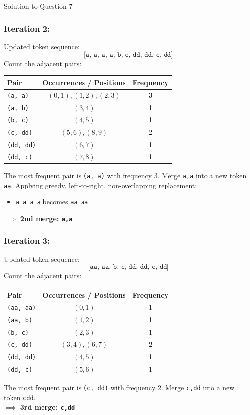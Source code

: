 \documentclass[11pt,a4paper]{article}
\begin{document}
\begin{solutionbox}{Solution to Question 7}
\subsubsection*{Iteration 2:}
Updated token sequence:
\[
\texttt{[a, a, a, a, b, c, dd, dd, c, dd]}
\]
Count the adjacent pairs:
\begin{center}
\begin{tabular}{lcc}
\toprule
\textbf{Pair} & \textbf{Occurrences / Positions} & \textbf{Frequency} \\
\midrule
\texttt{(a, a)} & $(0,1), (1,2), (2,3)$ & \textbf{3} \\
\texttt{(a, b)} & $(3,4)$ & 1 \\
\texttt{(b, c)} & $(4,5)$ & 1 \\
\texttt{(c, dd)} & $(5,6), (8,9)$ & 2 \\
\texttt{(dd, dd)} & $(6,7)$ & 1 \\
\texttt{(dd, c)} & $(7,8)$ & 1 \\
\bottomrule
\end{tabular}
\end{center}
The most frequent pair is \texttt{(a, a)} with frequency 3.
Merge \texttt{a,a} into a new token \texttt{aa}.
Applying greedy, left-to-right, non-overlapping replacement:
\begin{itemize}
    \item \texttt{a a a a} becomes \texttt{aa aa}
\end{itemize}
$\implies$ \textbf{2nd merge: \texttt{a,a}}

\subsubsection*{Iteration 3:}
Updated token sequence:
\[
\texttt{[aa, aa, b, c, dd, dd, c, dd]}
\]
Count the adjacent pairs:
\begin{center}
\begin{tabular}{lcc}
\toprule
\textbf{Pair} & \textbf{Occurrences / Positions} & \textbf{Frequency} \\
\midrule
\texttt{(aa, aa)} & $(0,1)$ & 1 \\
\texttt{(aa, b)} & $(1,2)$ & 1 \\
\texttt{(b, c)} & $(2,3)$ & 1 \\
\texttt{(c, dd)} & $(3,4), (6,7)$ & \textbf{2} \\
\texttt{(dd, dd)} & $(4,5)$ & 1 \\
\texttt{(dd, c)} & $(5,6)$ & 1 \\
\bottomrule
\end{tabular}
\end{center}
The most frequent pair is \texttt{(c, dd)} with frequency 2.
Merge \texttt{c,dd} into a new token \texttt{cdd}.\\
$\implies$ \textbf{3rd merge: \texttt{c,dd}}
\end{solutionbox}
\end{document}
